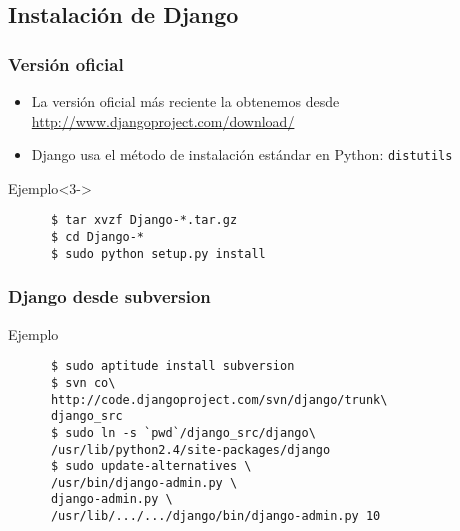 \documentclass{beamer}
\newenvironment{ejemplo}{\begin{exampleblock}{Ejemplo}}{\end{exampleblock}}
\begin{document}

\subsection{Instalación de Django}
\begin{frame}[fragile]
  \frametitle{Versión oficial}
  \begin{itemize}[<+->]
    \item
      La versión oficial más reciente la obtenemos desde
      \url{http://www.djangoproject.com/download/}
    \item
      \alert{Django} usa el método de instalación estándar en
      \alert{Python}: \texttt{distutils}
  \end{itemize}
  \begin{ejemplo}<3->
    \begin{verbatim}
      $ tar xvzf Django-*.tar.gz
      $ cd Django-*
      $ sudo python setup.py install
    \end{verbatim}
  \end{ejemplo}
\end{frame}

\begin{frame}[fragile]
  \frametitle{Django desde subversion}
  \begin{ejemplo}
    \begin{verbatim}
      $ sudo aptitude install subversion
      $ svn co\
      http://code.djangoproject.com/svn/django/trunk\
      django_src
      $ sudo ln -s `pwd`/django_src/django\
      /usr/lib/python2.4/site-packages/django
      $ sudo update-alternatives \
      /usr/bin/django-admin.py \
      django-admin.py \
      /usr/lib/.../.../django/bin/django-admin.py 10
    \end{verbatim}
  \end{ejemplo}
\end{frame}
\end{document}
